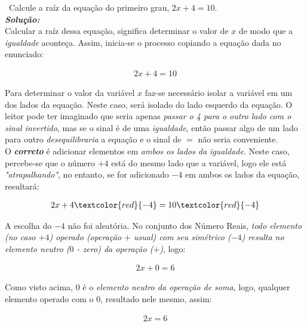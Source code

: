 \begin{example}
\video \, Calcule a raíz da equação do primeiro grau, $2x+4=10$.
\\
\textbf{\textit{Solução:}}
\\
Calcular a raíz dessa equação, significa determinar o valor de $x$ de modo que a \textit{igualdade} aconteça. Assim, inicia-se o processo copiando a equação dada no enunciado:

\begin{ceqn}
	\begin{align*}
	2x+4=10
	\end{align*}
\end{ceqn}

Para determinar o valor da variável $x$ faz-se necessário isolar a variável em um dos lados da equação. Neste caso, será isolado do lado esquerdo da equação. O leitor pode ter imaginado que seria apenas \textit{passar o 4 para o outro lado com o sinal invertido}, mas se o sinal é de uma \textit{igualdade}, então passar algo de um lado para outro \textit{desequilibraria} a equação e o sinal de $=$ não seria conveniente.
\\
\indent O \textit{\textbf{correto}} é adicionar elementos em \textit{ambos os lados da igualdade}. Neste caso, percebe-se que o número $+4$ está do mesmo lado que a variável, logo ele está \textit{"atrapalhando"}, no entanto, se for adicionado $-4$ em ambos os lados da equação, resultará:

\begin{ceqn}
	\begin{align*}
	2x+4 \textcolor{red}{-4} = 10 \textcolor{red}{-4}
	\end{align*}
\end{ceqn}

A escolha do $-4$ não foi aleatória. No conjunto dos Número Reais, \textit{todo elemento (no caso $+4$) operado (operação $+$ usual) com seu simétrico ($-4$) resulta no elemento neutro ($0$ - zero) da operação ($+$)}, logo:

\begin{ceqn}
	\begin{align*}
	2x + 0 = 6
	\end{align*}
\end{ceqn}

Como visto acima, $0$ é o \textit{elemento neutro da operação de soma}, logo, qualquer elemento operado com o $0$, resultado nele mesmo, assim:

\begin{ceqn}
	\begin{align*}
	2x = 6
	\end{align*}
\end{ceqn}


\end{example}
